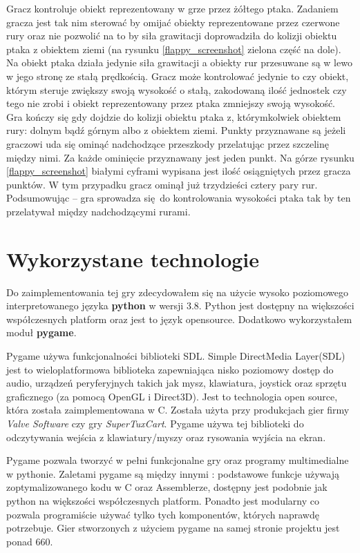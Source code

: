 \documentclass[a4paper, 12pt,oneside]{book}
\begin{document}
Gracz kontroluje obiekt reprezentowany w grze przez żółtego ptaka.
Zadaniem gracza jest tak nim sterować by omijać obiekty reprezentowane przez 
czerwone rury oraz nie pozwolić na to by siła grawitacji doprowadziła do
kolizji obiektu ptaka z obiektem ziemi (na rysunku \ref{flappy_screenshot}
zielona część na dole). Na obiekt ptaka działa jedynie siła grawitacji a
obiekty rur przesuwane są w lewo w jego stronę ze stałą prędkością. Gracz
może kontrolować jedynie to czy obiekt, którym steruje zwiększy swoją
wysokość o stałą, zakodowaną ilość jednostek czy tego nie zrobi i obiekt
reprezentowany przez ptaka zmniejszy swoją wysokość. Gra kończy się gdy
dojdzie do kolizji obiektu ptaka z, którymkolwiek obiektem rury: dolnym
bądź górnym albo z obiektem ziemi. Punkty przyznawane są jeżeli graczowi uda
się ominąć nadchodzące przeszkody przelatując przez szczelinę między nimi.
Za każde ominięcie przyznawany jest jeden punkt. Na górze rysunku
\ref{flappy_screenshot} białymi cyframi wypisana jest ilość osiągniętych przez
gracza punktów. W tym przypadku gracz ominął już trzydzieści cztery pary rur.
Podsumowując -- gra sprowadza się do kontrolowania wysokości ptaka tak by ten
przelatywał między nadchodzącymi rurami.

\section{Wykorzystane technologie}
Do zaimplementowania tej gry zdecydowałem się na użycie wysoko poziomowego
interpretowanego języka \textbf{python} w wersji 3.8. Python jest dostępny na
większości współczesnych platform oraz jest to język  open\dywiz source.
Dodatkowo wykorzystałem moduł \textbf{pygame}.

Pygame używa funkcjonalności biblioteki SDL. Simple DirectMedia Layer(SDL)
jest to wieloplatformowa biblioteka zapewniająca nisko poziomowy dostęp do
audio, urządzeń peryferyjnych takich jak mysz, klawiatura, joystick oraz
sprzętu graficznego (za pomocą OpenGL i Direct3D). Jest to technologia open
source, która została zaimplementowana w C. Została użyta przy produkcjach gier
firmy \textit{Valve Software} czy gry \textit{SuperTuxCart}\cite{sdl_ref}.
Pygame używa tej biblioteki do odczytywania wejścia z klawiatury/myszy oraz
rysowania wyjścia na ekran.

Pygame pozwala tworzyć w pełni funkcjonalne gry oraz programy multimedialne
w pythonie. Zaletami pygame są między innymi : podstawowe funkcje używają
zoptymalizowanego kodu w C oraz Assemblerze, dostępny jest podobnie jak python
na większości współczesnych platform. Ponadto jest modularny co pozwala
programiście używać tylko tych komponentów, których naprawdę potrzebuje.
Gier stworzonych z użyciem pygame na samej stronie projektu jest ponad
660\cite{pygame_about_ref}.
\end{document}
